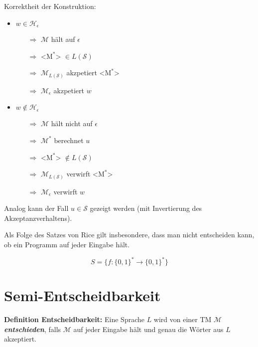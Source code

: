 \documentclass{scrartcl}%
\begin{document}
    Korrektheit der Konstruktion:
    \begin{itemize}
        \item $w \in \mathcal{H}_\epsilon$
        \begin{itemize}
            \item [$\Rightarrow$] $\mathcal{M}$ hält auf $\epsilon$
            \item [$\Rightarrow$] <$\text{M}^*$> $\in L(\mathcal{S})$
            \item [$\Rightarrow$] $\mathcal{M}_{L(\mathcal{S})}$ akzpetiert <$\text{M}^*$>
            \item [$\Rightarrow$] $\mathcal{M}_{\epsilon}$ akzpetiert $w$
        \end{itemize}
        \item $w \notin \mathcal{H}_\epsilon$
        \begin{itemize}
            \item [$\Rightarrow$] $\mathcal{M}$ hält nicht auf $\epsilon$
            \item [$\Rightarrow$] $\mathcal{M}^*$ berechnet $u$
            \item [$\Rightarrow$] <$\text{M}^*$> $\notin L(\mathcal{S})$
            \item [$\Rightarrow$] $\mathcal{M}_{L(\mathcal{S})}$ verwirft <$\text{M}^*$>
            \item [$\Rightarrow$] $\mathcal{M}_{\epsilon}$ verwirft $w$
        \end{itemize}
    \end{itemize}

    Analog kann der Fall $u \in \mathcal{S}$ gezeigt werden (mit Invertierung des Akzeptanzverhaltens).\proofend

    \vspace*{0.3cm}
    Als Folge des Satzes von Rice gilt insbesondere, dass man nicht entscheiden kann,
    ob ein Programm auf jeder Eingabe hält.

    \begin{equation*}
        S = \{ f: \{0,1\}^* \rightarrow \{0,1\}^* \}
    \end{equation*}

    \section*{Semi-Entscheidbarkeit}

    \textbf{\textsf{Definition Entscheidbarkeit:}}
    Eine Sprache $L$ wird von einer TM $\mathcal{M}$ \textit{\textbf{\textsf{entschieden}}}, falls $\mathcal{M}$ auf jeder Eingabe hält und genau die Wörter aus $L$ akzeptiert.
\end{document}
